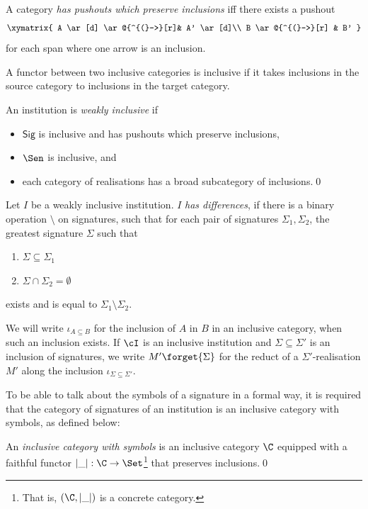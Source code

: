 \documentclass[10pt, a4paper]{isov2}
\newcommand{\Sig}{\mathsf{Sig}}
\begin{document}
\noindent
A category \emph{has pushouts which preserve inclusions} iff 
there exists a pushout
%
\begin{equation*}
\xymatrix{
  A  \ar[d] \ar@{^{(}->}[r]& A' \ar[d]\\
  B \ar@{^{(}->}[r] & B'
}
\end{equation*}
%
for each span where one arrow is an inclusion.

A functor between two inclusive categories is inclusive if it takes inclusions in the source category to inclusions in the target category.

\begin{definition}
An institution is \emph{weakly inclusive} if
\begin{itemize}
  \item $\Sig$ is inclusive and has pushouts which preserve inclusions,
  \item $\Sen$ is inclusive, and
  \item each category of realisations has a broad subcategory of inclusions.\quad\qed
\end{itemize}
\end{definition}

Let $I$ be a weakly inclusive institution.  $I$  \emph{has differences}, if there is a binary operation $\setminus$ on signatures, 
such that for each pair of signatures 
$\Sigma_1, \Sigma_2$, the greatest signature $\Sigma$ such that
\begin{enumerate}
  \item $\Sigma \subseteq \Sigma_1$
  \item $\Sigma \cap \Sigma_2 = \emptyset$
\end{enumerate} 
exists and is equal to $\Sigma_1\setminus \Sigma_2$.

We will write $\iota_{A\subseteq B}$ for the inclusion of $A$ in $B$ in an
inclusive category, when such an inclusion exists. If $\cI$ is an inclusive institution
and $\Sigma\subseteq\Sigma'$ is an inclusion of signatures, we write 
$M'\forget{\Sigma}$ for the reduct of a $\Sigma'$-realisation $M'$ along the inclusion
$\iota_{\Sigma\subseteq\Sigma'}$.

To be able to talk about the symbols of a signature in a formal way, it
is required that the category of signatures of an institution is an
inclusive category with symbols, as defined below:

\begin{definition}
An \emph{inclusive category with symbols} is an inclusive category
$\C$ equipped with a faithful functor $|\_|:\C\to\Set$\footnote{That is,
$(\C,|\_|)$ is a concrete category.} that preserves
inclusions.\quad\qed
\end{definition}
\end{document}
